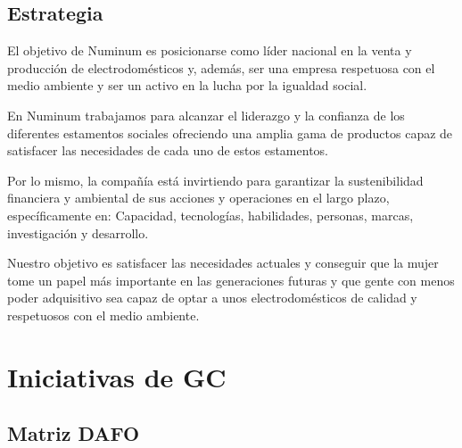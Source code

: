 \documentclass[twoside]{article}
\begin{document}
\subsection{Estrategia}

El objetivo de Numinum es posicionarse como líder nacional en la venta y producción de electrodomésticos y, además, ser una empresa respetuosa con el medio ambiente y ser un activo en la lucha por la igualdad social.

En Numinum trabajamos para alcanzar el liderazgo y la confianza de los diferentes estamentos sociales ofreciendo una amplia gama de productos capaz de satisfacer las necesidades de cada uno de estos estamentos.

Por lo mismo, la compañía está invirtiendo para garantizar la sustenibilidad financiera y ambiental de sus acciones y operaciones en el largo plazo, específicamente en: Capacidad, tecnologías, habilidades, personas, marcas, investigación y desarrollo.

Nuestro objetivo es satisfacer las necesidades actuales y conseguir que la mujer tome un papel más importante en las generaciones futuras y que gente con menos poder adquisitivo sea capaz de optar a unos electrodomésticos de calidad y respetuosos con el medio ambiente.
\newpage


\section{Iniciativas de GC}

\subsection{Matriz DAFO}
\end{document}
